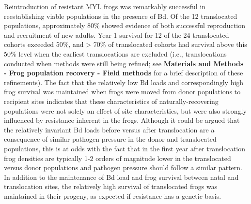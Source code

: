 \documentclass[9pt,twocolumn,twoside,lineno]{pnas-new}
\begin{document}
Reintroduction of resistant MYL frogs was remarkably successful in
reestablishing viable populations in the presence of Bd. Of the 12
translocated populations, approximately 80\% showed evidence of both
successful reproduction and recruitment of new adults. Year-1 survival
for 12 of the 24 translocated cohorts exceeded 50\%, and \textgreater{}
70\% of translocated cohorts had survival above this 50\% level when the
earliest translocations are excluded (i.e., translocations conducted
when methods were still being refined; see \textbf{Materials and Methods
- Frog population recovery - Field methods} for a brief description of
these refinements). The fact that the relatively low Bd loads and
correspondingly high frog survival was maintained when frogs were moved
from donor populations to recipient sites indicates that these
characteristics of naturally-recovering populations were not solely an
effect of site characteristics, but were also strongly influenced by
resistance inherent in the frogs. Although it could be argued that the
relatively invariant Bd loads before versus after translocation are a
consequence of similar pathogen pressure in the donor and translocated
populations, this is at odds with the fact that in the first year after
translocation frog densities are typically 1-2 orders of magnitude lower
in the translocated versus donor populations and pathogen pressure
should follow a similar pattern. In addition to the maintenance of Bd
load and frog survival between natal and translocation sites, the
relatively high survival of translocated frogs was maintained in their
progeny, as expected if resistance has a genetic basis.
\end{document}
